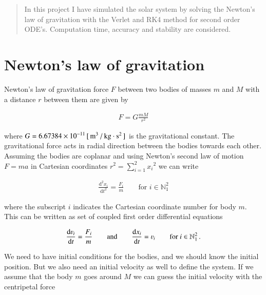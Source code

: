\documentclass[11pt,english,a4paper]{article}
\begin{document}
\maketitle
\begin{flushleft}

\begin{abstract}
In this project I have simulated the solar system by solving the Newton's law of gravitation with the Verlet and RK4 method for second order ODE's. Computation time, accuracy and stability are considered.
\end{abstract}

\section{Newton's law of gravitation}

Newton's law of gravitation force $F$ between two bodies of masses $m$ and $M$ with a distance $r$ between them are given by

\begin{align}
F = G \frac{m M}{r^2}
\label{eq_1}
\end{align}

where $G = 6.67384\times {10}^{-11}\,[\,\mathrm{{m^3}\,/\,{kg\cdot s^2}}\,]$ is the gravitational constant. The gravitational force acts in radial direction between the bodies towards each other. Assuming the bodies are coplanar and using Newton's second law of motion $F=ma$ in Cartesian coordinates $r^2=\sum_{i=1}^2 {x_i}^2$ we can write

\begin{align*}
\frac{\mathrm{d}^2 x_i}{\mathrm{d}t^2} = \frac{F_i}{m} \qquad \text{for } i\in\mathbb{N}_1^2
\end{align*}

where the subscript $i$ indicates the Cartesian coordinate number for body $m$. This can be written as set of coupled first order differential equations

\begin{align*}
\frac{\mathrm{d}\varv_i}{\mathrm{d}t} = \frac{F_i}{m} \qquad \text{and} \qquad
\frac{\mathrm{d}x_i}{\mathrm{d}t} = \varv_i \qquad \text{for } i\in\mathbb{N}_1^2\,.
\end{align*}

We need to have initial conditions for the bodies, and we should know the initial position. But we also need an initial velocity as well to define the system. If we assume that the body $m$ goes around $M$ we can guess the initial velocity with the centripetal force


\end{flushleft}
\end{document}

